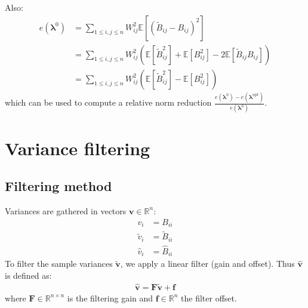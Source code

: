 \documentclass[12pt]{scrartcl}
\begin{document}
$  $\\
Also: 
\begin{align}
e\left(\boldsymbol{\lambda}^0\right) & = \sum_{1 \le i,j \le n} W_{ij}^2 \mathbb{E}\left[ \left(\widetilde{B}_{ij} - B_{ij} \right)^2 \right] \nonumber \\
& = \sum_{1 \le i,j \le n} W_{ij}^2 \left(\mathbb{E}\left[ \widetilde{B}_{ij}^2 \right] + \mathbb{E}\left[ B^2_{ij} \right] - 2 \mathbb{E}\left[ \widetilde{B}_{ij} B_{ij} \right] \right) \nonumber \\
& = \sum_{1 \le i,j \le n} W_{ij}^2 \left(\mathbb{E}\left[ \widetilde{B}_{ij}^2 \right] - \mathbb{E}\left[ B^2_{ij} \right]\right)
\end{align}
which can be used to compute a relative norm reduction $\displaystyle \frac{e\left(\boldsymbol{\lambda}^0\right) - e\left(\boldsymbol{\lambda}^\mathrm{opt}\right)}{e\left(\boldsymbol{\lambda}^0\right)}$.

\clearpage

\section{Variance filtering}

\subsection{Filtering method}
Variances are gathered in vectors $\mathbf{v} \in \mathbb{R}^n$:
\begin{subequations}
\begin{align}
v_i & = B_{ii} \\
\widetilde{v}_i & = \widetilde{B}_{ii} \\
\widehat{v}_i & = \widehat{B}_{ii}
\end{align}
\end{subequations}
To filter the sample variances $\widetilde{\mathbf{v}}$, we apply a linear filter (gain and offset). Thus $\widehat{\mathbf{v}}$ is defined as:
\begin{align}
\label{eq:var_filter}
\widehat{\mathbf{v}} = \mathbf{F} \widetilde{\mathbf{v}} + \mathbf{f}
\end{align}
where $\mathbf{F} \in \mathbb{R}^{n \times n}$ is the filtering gain and $\mathbf{f} \in \mathbb{R}^n$ the filter offset. 
\end{document}

